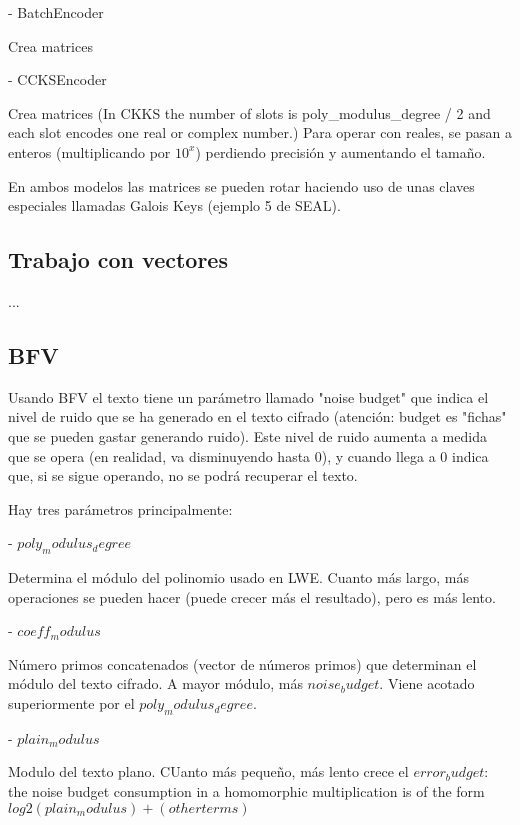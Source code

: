     - BatchEncoder

    Crea matrices

    - CCKSEncoder

    Crea matrices (In CKKS the number of slots is poly\_modulus\_degree / 2 and each slot encodes one real or complex number.) Para operar con reales, se pasan a enteros (multiplicando por $10^x$) perdiendo precisión y aumentando el tamaño.


    En ambos modelos las matrices se pueden rotar haciendo uso de unas claves especiales llamadas Galois Keys (ejemplo 5 de SEAL).

\subsection{Trabajo con vectores}

...

\subsection{BFV}

Usando BFV el texto tiene un parámetro llamado "noise budget" que indica el nivel de ruido que se ha generado en el texto cifrado (atención: budget es "fichas" que se pueden gastar generando ruido). Este nivel de ruido aumenta a medida que se opera (en realidad, va disminuyendo hasta 0), y cuando llega a 0 indica que, si se sigue operando, no se podrá recuperar el texto.


Hay tres parámetros principalmente:

- $poly_modulus_degree$

Determina el módulo del polinomio usado en LWE. Cuanto más largo, más operaciones se pueden hacer (puede crecer más el resultado), pero es más lento.

- $coeff_modulus$

Número primos concatenados (vector de números primos) que determinan el módulo del texto cifrado. A mayor módulo, más $noise_budget$. Viene acotado superiormente por el $poly_modulus_degree$.

- $plain_modulus$

Modulo del texto plano. CUanto más pequeño, más lento crece el $error_budget$: the noise budget consumption in a homomorphic multiplication is of the form $log2(plain_modulus) + (other terms)$

